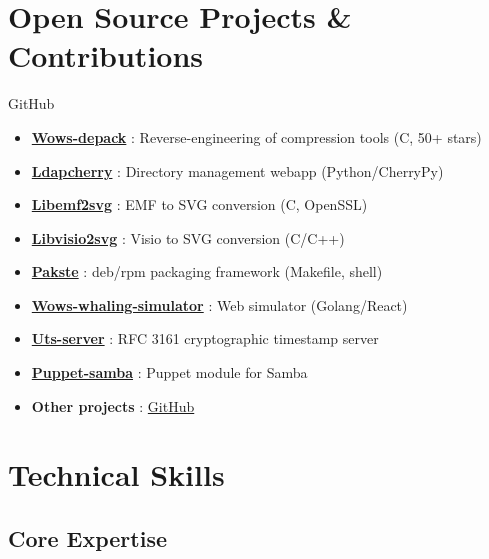 \documentclass[10pt,a4paper,sans]{moderncv}
\begin{document}
\section{Open Source Projects \& Contributions}
        {GitHub}
        {}
        {}
        {
        \begin{itemize}
        \item \textbf{\href{https://github.com/wows-tools/wows-depack}{Wows-depack}} : Reverse-engineering of compression tools (C, 50+ stars)
        \item \textbf{\href{https://github.com/kakwa/ldapcherry}{Ldapcherry}} : Directory management webapp (Python/CherryPy)
        \item \textbf{\href{https://github.com/kakwa/libemf2svg}{Libemf2svg}} : EMF to SVG conversion (C, OpenSSL)
        \item \textbf{\href{https://github.com/kakwa/libvisio2svg}{Libvisio2svg}} : Visio to SVG conversion (C/C++)
        \item \textbf{\href{https://github.com/kakwa/pakste}{Pakste}} : deb/rpm packaging framework (Makefile, shell)
        \item \textbf{\href{https://github.com/wows-tools/wows-whaling-simulator}{Wows-whaling-simulator}} : Web simulator (Golang/React)
        \item \textbf{\href{https://github.com/kakwa/uts-server}{Uts-server}} : RFC 3161 cryptographic timestamp server
        \item \textbf{\href{https://github.com/kakwa/puppet-samba}{Puppet-samba}} : Puppet module for Samba
        \item \textbf{Other projects} : \href{https://github.com/kakwa?tab=repositories&q=&type=&language=&sort=stargazers}{GitHub}
        \end{itemize}
        }

\section{Technical Skills}

\subsection{Core Expertise}
\end{document}
